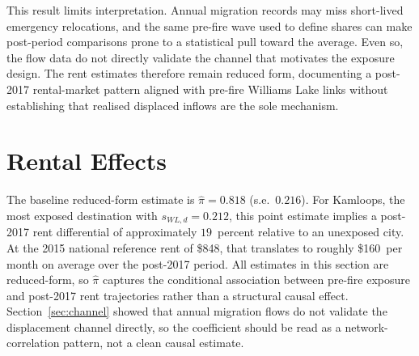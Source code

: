 \documentclass[12pt]{article}
\begin{document}
This result limits interpretation. Annual migration records may miss short-lived
emergency relocations, and the same pre-fire wave used to define shares can make
post-period comparisons prone to a statistical pull toward the average. Even so, the flow
data do not directly validate the channel that motivates the exposure design.
The rent estimates therefore remain reduced form, documenting a post-2017
rental-market pattern aligned with pre-fire Williams Lake links without
establishing that realised displaced inflows are the sole mechanism.

\section{Rental Effects}
\label{sec:results}

The baseline reduced-form estimate is $\hat{\pi} = 0.818$
(s.e.\ $0.216$). For Kamloops, the most exposed destination with
$s_{WL,d} = 0.212$, this point estimate implies a post-2017 rent differential
of approximately $19$~percent relative to an unexposed city. At the 2015
national reference rent of \$848, that translates to roughly \$160~per month on average over the post-2017 period.
All estimates in this section are reduced-form, so $\hat{\pi}$ captures the
conditional association between pre-fire exposure and post-2017 rent
trajectories rather than a structural causal effect. Section~\ref{sec:channel} showed
that annual migration flows do not validate the displacement channel directly,
so the coefficient should be read as a network-correlation pattern, not a clean
causal estimate.

\end{document}
